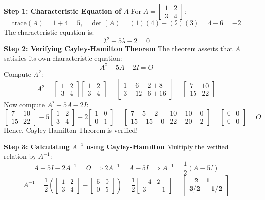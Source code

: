 \begin{solutionbox}
\textbf{Step 1: Characteristic Equation of $A$}
For $A = \begin{bmatrix} 1 & 2 \\ 3 & 4 \end{bmatrix}$:
\[
\text{trace}(A) = 1 + 4 = 5, \quad \det(A) = (1)(4) - (2)(3) = 4 - 6 = -2
\]
The characteristic equation is:
\[
\lambda^2 - 5\lambda - 2 = 0
\]
\textbf{Step 2: Verifying Cayley-Hamilton Theorem}
The theorem asserts that $A$ satisfies its own characteristic equation:
\[
A^2 - 5A - 2I = O
\]
Compute $A^2$:
\[
A^2 = \begin{bmatrix} 1 & 2 \\ 3 & 4 \end{bmatrix}\begin{bmatrix} 1 & 2 \\ 3 & 4 \end{bmatrix} = \begin{bmatrix} 1+6 & 2+8 \\ 3+12 & 6+16 \end{bmatrix} = \begin{bmatrix} 7 & 10 \\ 15 & 22 \end{bmatrix}
\]
Now compute $A^2 - 5A - 2I$:
\[
\begin{bmatrix} 7 & 10 \\ 15 & 22 \end{bmatrix} - 5\begin{bmatrix} 1 & 2 \\ 3 & 4 \end{bmatrix} - 2\begin{bmatrix} 1 & 0 \\ 0 & 1 \end{bmatrix} = \begin{bmatrix} 7 - 5 - 2 & 10 - 10 - 0 \\ 15 - 15 - 0 & 22 - 20 - 2 \end{bmatrix} = \begin{bmatrix} 0 & 0 \\ 0 & 0 \end{bmatrix} = O
\]
Hence, Cayley-Hamilton Theorem is verified!

\textbf{Step 3: Calculating $A^{-1}$ using Cayley-Hamilton}
Multiply the verified relation by $A^{-1}$:
\[
A - 5I - 2A^{-1} = O \implies 2A^{-1} = A - 5I \implies A^{-1} = \frac{1}{2}(A - 5I)
\]
\[
A^{-1} = \frac{1}{2}\left(\begin{bmatrix} 1 & 2 \\ 3 & 4 \end{bmatrix} - \begin{bmatrix} 5 & 0 \\ 0 & 5 \end{bmatrix}\right) = \frac{1}{2}\begin{bmatrix} -4 & 2 \\ 3 & -1 \end{bmatrix} = \mathbf{\begin{bmatrix} -2 & 1 \\ 3/2 & -1/2 \end{bmatrix}}
\]


\end{solutionbox}
